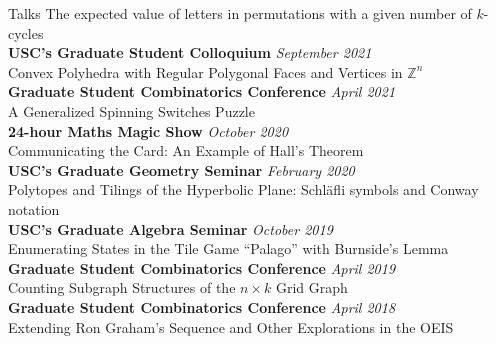 \documentclass{cv} %
\begin{document}
\begin{rSection}{Talks}
  The expected value of letters in permutations with a given number of $k$-cycles
  \\
  \textbf{USC's Graduate Student Colloquium} \hfill \textit{September 2021} \\
  Convex Polyhedra with Regular Polygonal Faces and Vertices in $\mathbb Z^n$
  \\
  \textbf{Graduate Student Combinatorics Conference} \hfill \textit{April 2021} \\
  A Generalized Spinning Switches Puzzle
  \\
  \textbf{24-hour Maths Magic Show} \hfill \textit{October 2020} \\
  Communicating the Card: An Example of Hall's Theorem
  \\
  \textbf{USC's Graduate Geometry Seminar} \hfill \textit{February 2020} \\
  Polytopes and Tilings of the Hyperbolic Plane: Schl\"afli symbols and Conway notation
  \\
  \textbf{USC's Graduate Algebra Seminar} \hfill \textit{October 2019} \\
  Enumerating States in the Tile Game ``Palago'' with Burnside's Lemma
  \\
  \textbf{Graduate Student Combinatorics Conference} \hfill \textit{April 2019} \\
  Counting Subgraph Structures of the \(n \times k\) Grid Graph
  \\
  \textbf{Graduate Student Combinatorics Conference} \hfill \textit{April 2018} \\
  Extending Ron Graham's Sequence and Other Explorations in the OEIS
\end{rSection}
\end{document}
